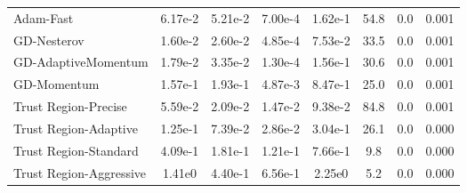\documentclass{article}
\begin{document}
\begin{table}[htbp]
{\begin{tabular}{p{2.5cm}*{7}{c}}
Adam-Fast & 6.17e-2 & 5.21e-2 & 7.00e-4 & 1.62e-1 & 54.8 & 0.0 & 0.001 \\
GD-Nesterov & 1.60e-2 & 2.60e-2 & 4.85e-4 & 7.53e-2 & 33.5 & 0.0 & 0.001 \\
GD-AdaptiveMomentum & 1.79e-2 & 3.35e-2 & 1.30e-4 & 1.56e-1 & 30.6 & 0.0 & 0.001 \\
GD-Momentum & 1.57e-1 & 1.93e-1 & 4.87e-3 & 8.47e-1 & 25.0 & 0.0 & 0.001 \\
Trust Region-Precise & 5.59e-2 & 2.09e-2 & 1.47e-2 & 9.38e-2 & 84.8 & 0.0 & 0.001 \\
Trust Region-Adaptive & 1.25e-1 & 7.39e-2 & 2.86e-2 & 3.04e-1 & 26.1 & 0.0 & 0.000 \\
Trust Region-Standard & 4.09e-1 & 1.81e-1 & 1.21e-1 & 7.66e-1 & 9.8 & 0.0 & 0.000 \\
Trust Region-Aggressive & 1.41e0 & 4.40e-1 & 6.56e-1 & 2.25e0 & 5.2 & 0.0 & 0.000 \\
\bottomrule
\end{tabular}
}
\end{table}
\end{document}
